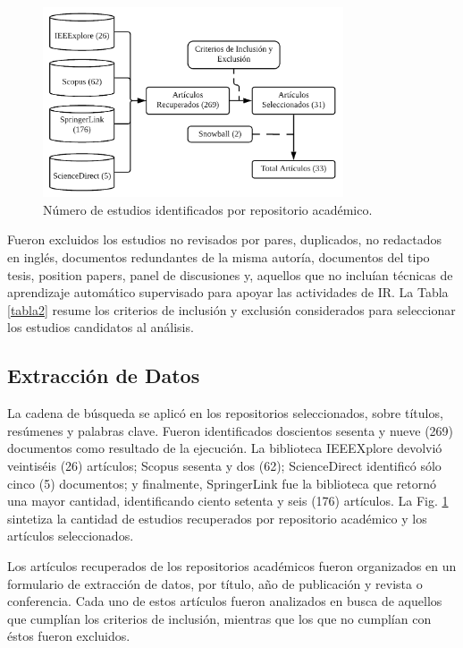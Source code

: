 \documentclass[journal]{IEEEtran}
\begin{document}
\begin{figure}[!t]
\centering
\includegraphics[width=3.5in]{figures/figure4_Guada.png}
\caption{Número de estudios identificados por repositorio acad\'emico.}
\label{fig:4}
\end{figure}

Fueron excluidos los estudios no revisados por pares, duplicados, no redactados en inglés, documentos redundantes de la misma autoría, documentos del tipo tesis, position papers, panel de discusiones y, aquellos que no incluían técnicas de aprendizaje automático supervisado para apoyar las actividades de IR. La Tabla \ref{tabla2} resume los criterios de inclusión y exclusión considerados para seleccionar los estudios candidatos al análisis.

\subsection{Extracción de Datos}

La cadena de búsqueda se aplicó en los repositorios seleccionados, sobre títulos, resúmenes y palabras clave. Fueron identificados doscientos sesenta y nueve (269) documentos como resultado de la ejecución. La biblioteca IEEEXplore devolvió veintiséis (26) artículos; Scopus sesenta y dos (62); ScienceDirect identificó sólo cinco (5) documentos; y finalmente, SpringerLink fue la biblioteca que retornó una mayor cantidad, identificando ciento setenta y seis (176) artículos. La Fig. \ref{fig:4} sintetiza la cantidad de estudios recuperados por repositorio académico y los artículos seleccionados.

Los artículos recuperados de los repositorios académicos fueron organizados en un formulario de extracción de datos, por título, año de publicación y revista o conferencia. Cada uno de estos artículos fueron analizados en busca de aquellos que cumplían los criterios de inclusión, mientras que los que no cumplían con éstos fueron excluidos. 
\end{document}
